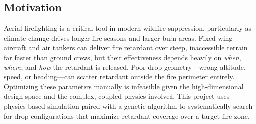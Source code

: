 \documentclass{article}
\begin{document}
\pagestyle{mypagestyle}







\subsection*{Motivation}
Aerial firefighting is a critical tool in modern wildfire suppression, particularly as climate change drives longer fire seasons and larger burn areas. Fixed-wing aircraft and air tankers can deliver fire retardant over steep, inaccessible terrain far faster than ground crews, but their effectiveness depends heavily on \textit{when}, \textit{where}, and \textit{how} the retardant is released. Poor drop geometry---wrong altitude, speed, or heading---can scatter retardant outside the fire perimeter entirely. Optimizing these parameters manually is infeasible given the high-dimensional design space and the complex, coupled physics involved. This project uses physics-based simulation paired with a genetic algorithm to systematically search for drop configurations that maximize retardant coverage over a target fire zone.
\end{document}
